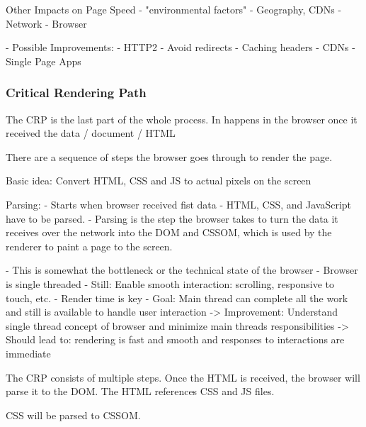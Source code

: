 Other Impacts on Page Speed
- "environmental factors"
- Geography, CDNs
- Network
- Browser


- Possible Improvements:
- HTTP2
- Avoid redirects
- Caching headers
- CDNs
- Single Page Apps







\subsubsection{Critical Rendering Path}

The CRP is the last part of the whole process.
In happens in the browser once it received the data / document / HTML

There are a sequence of steps the browser goes through to render the page.

Basic idea:  Convert HTML, CSS and JS to actual pixels on the screen


Parsing:
- Starts when browser received fist data
- HTML, CSS, and JavaScript have to be parsed.
- Parsing is the step the browser takes to turn the data it receives over the network into the DOM and CSSOM, which is used by the renderer to paint a page to the screen.





- This is somewhat the bottleneck or the technical state of the browser
- Browser is single threaded
- Still: Enable smooth interaction: scrolling, responsive to touch, etc.
- Render time is key
- Goal: Main thread can complete all the work and still is available to handle user interaction
-> Improvement: Understand single thread concept of browser and minimize main threads responsibilities
-> Should lead to: rendering is fast and smooth and responses to interactions are immediate




The CRP consists of multiple steps.
Once the HTML is received, the browser will parse it to the DOM.
The HTML references CSS and JS files.

CSS will be parsed to CSSOM.

